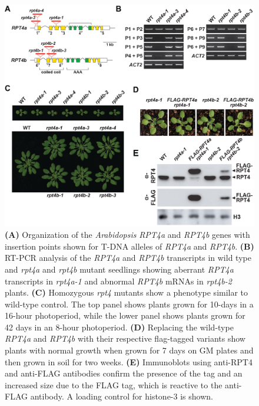  \begin{figure}[p]
	\centering
	\includegraphics[width=\columnwidth]{Proteasome/rpt4abtransgenic.png}
	{\textbf{(A)} Organization of the \textit{Arabidopsis} \textit{RPT4a} and \textit{RPT4b} genes with insertion points shown for T-DNA alleles of \textit{RPT4a} and \textit{RPT4b}. \textbf{(B)} RT-PCR analysis of the \textit{RPT4a} and \textit{RPT4b} transcripts in wild type and \textit{rpt4a} and \textit{rpt4b} mutant seedlings showing aberrant \textit{RPT4a} transcripts in \textit{rpt4a-1} and abnormal \textit{RPT4b} mRNAs in \textit{rpt4b-2} plants. \textbf{(C)} Homozygous \textit{rpt4} mutants show a phenotype similar to wild-type control. The top panel shows plants grown for 10-days in a 16-hour photoperiod, while the lower panel shows plants grown for 42 days in an 8-hour photoperiod. \textbf{(D)} Replacing the wild-type \textit{RPT4a} and \textit{RPT4b} with their respective flag-tagged variants show plants with normal growth when grown for 7 days on GM plates and then grown in soil for two weeks. \textbf{(E)} Immunoblots using anti-RPT4 and anti-FLAG antibodies confirm the presence of the tag and an increased size due to the FLAG tag, which is reactive to the anti-FLAG antibody. A loading control for histone-3 is shown.}
	\label{fig:transgenic}
\end{figure}
